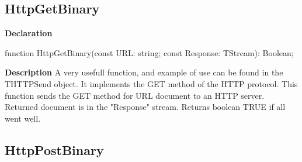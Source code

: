 \documentclass{report}
\newif\ifpdf
\begin{document}
\subsection*{HttpGetBinary}
\fi
\label{httpsend-HttpGetBinary}
\begin{list}{}{
\setlength{\itemindent}{0cm}
\setlength{\listparindent}{0cm}
\setlength{\leftmargin}{\evensidemargin}
\addtolength{\leftmargin}{\tmplength}
\settowidth{\labelsep}{X}
\addtolength{\leftmargin}{\labelsep}
\setlength{\labelwidth}{\tmplength}
}
\item[\textbf{Declaration}\hfill]
\ifpdf
\begin{flushleft}
\fi
\begin{ttfamily}
function HttpGetBinary(const URL: string; const Response: TStream): Boolean;\end{ttfamily}

\ifpdf
\end{flushleft}
\fi

\par
\item[\textbf{Description}]
A very usefull function, and example of use can be found in the THTTPSend object. It implements the GET method of the HTTP protocol. This function sends the GET method for URL document to an HTTP server. Returned document is in the "Response" stream. Returns boolean TRUE if all went well.

\end{list}
\ifpdf
\subsection*{\large{\textbf{HttpPostBinary}}\normalsize\hspace{1ex}\hrulefill}
\else
\end{document}
